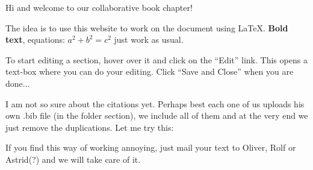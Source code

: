 Hi and welcome to our collaborative book chapter!  

The idea is to use this website to work on the document using \LaTeX.  \textbf{Bold text}, equations: $a^2+b^2=c^2$ just work as usual.  

To start editing a section, hover over it and click on the ``Edit'' link.  This opens a text-box where you can do your editing.  Click ``Save and Close'' when you are done...

I am not so sure about the citations yet.  Perhaps best each one of us uploads his own .bib file (in the folder section), we include all of them and at the very end we just remove the duplications.  
Let me try this: \cite{buehler2012}

If you find this way of working annoying, just mail your text to Oliver, Rolf or Astrid(?) and we will take care of it.  
